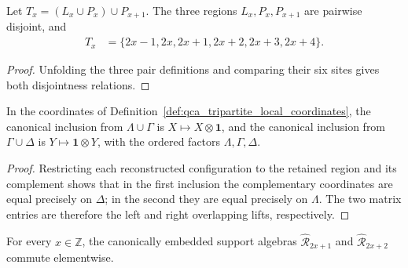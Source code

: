 \begin{lemma}
    \label{lem:qca_consecutive_pair_geometry}
    \leanok
    Let $T_x=(L_x\cup P_x)\cup P_{x+1}$. The three regions
    $L_x,P_x,P_{x+1}$ are pairwise disjoint, and
    \begin{align}
        T_x & =\{2x-1,2x,2x+1,2x+2,2x+3,2x+4\}.
    \end{align}
\end{lemma}

\begin{proof}\leanok
    Unfolding the three pair definitions and comparing their six sites gives both disjointness relations.
\end{proof}

\begin{lemma}
    \label{thm:qca_consecutive_pair_tripartite_coordinates}
    \leanok
    In the coordinates of Definition~\ref{def:qca_tripartite_local_coordinates},
    the canonical inclusion from $\Lambda\cup\Gamma$ is
    $X\mapsto X\otimes\mathbf 1$, and the canonical inclusion from
    $\Gamma\cup\Delta$ is $Y\mapsto\mathbf 1\otimes Y$, with the ordered
    factors $\Lambda,\Gamma,\Delta$.
\end{lemma}

\begin{proof}\leanok
    Restricting each reconstructed configuration to the retained region and its
    complement shows that in the first inclusion the complementary coordinates are
    equal precisely on $\Delta$; in the second they are equal precisely on
    $\Lambda$.  The two matrix entries are therefore the left and right
    overlapping lifts, respectively.
\end{proof}

\begin{lemma}
    \label{thm:qca_consecutive_support_algebras_commute}
    \leanok
    For every $x\in\mathbb Z$, the canonically embedded support algebras
    $\widehat{\mathcal R}_{2x+1}$ and
    $\widehat{\mathcal R}_{2x+2}$ commute elementwise.
\end{lemma}

